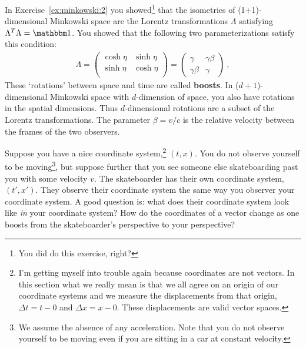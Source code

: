 \documentclass[12pt]{article}
\begin{document}
In Exercise~\ref{ex:minkowski:2} you showed\footnote{You did do this exercise, right?} that the isometries of (1+1)-dimensional Minkowski space are the Lorentz transformations $\Lambda$ satisfying $\Lambda^T \Lambda = \one$. You showed that the following two parameterizations satisfy this condition:
\begin{align}
    \Lambda = 
    \begin{pmatrix}
        \cosh\eta & \sinh\eta \\
        \sinh\eta & \cosh\eta\\
    \end{pmatrix}
    = 
    \begin{pmatrix}
        \gamma & \gamma\beta\\
        \gamma\beta & \gamma
    \end{pmatrix} \ ,
\end{align}
These `rotations' between space and time are called \textbf{boosts}. In ($d+1$)-dimensional Minkowski space with $d$-dimension of space, you also have rotations in the spatial dimensions. Thus $d$-dimensional rotations are a subset of the Lorentz transformations. The parameter $\beta=v/c$ is the relative velocity between the frames of the two observers. 

Suppose you have a nice coordinate system,\footnote{I'm getting myself into trouble again because coordinates are not vectors. In this section what we really mean is that we all agree on an origin of our coordinate systems and we measure the displacements from that origin, $\Delta t = t-0$ and $\Delta x = x-0$. These displacements are valid vector spaces.} $(t,x)$. You do not observe yourself to be moving\footnote{We assume the absence of any acceleration. Note that you do not observe yourself to be moving even if you are sitting in a car at constant velocity.}, but suppose further that you see someone else skateboarding past you with some velocity $v$. The skateboarder has their own coordinate system, $(t',x')$. They observe their coordinate system the same way you observer your coordinate system. A good question is: what does their coordinate system look like \emph{in} your coordinate system? How do the coordinates of a vector change as one boosts from the skateboarder's perspective to your perspective?
\end{document}
